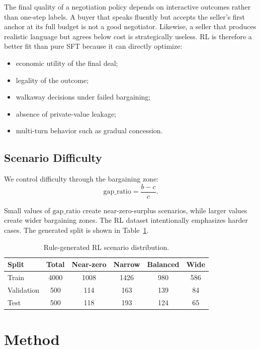 \documentclass[11pt]{article}
\begin{document}
The final quality of a negotiation policy depends on interactive outcomes rather than one-step labels. A buyer that speaks fluently but accepts the seller's first anchor at its full budget is not a good negotiator. Likewise, a seller that produces realistic language but agrees below cost is strategically useless. RL is therefore a better fit than pure SFT because it can directly optimize:
\begin{itemize}
    \item economic utility of the final deal;
    \item legality of the outcome;
    \item walkaway decisions under failed bargaining;
    \item absence of private-value leakage;
    \item multi-turn behavior such as gradual concession.
\end{itemize}

\subsection{Scenario Difficulty}

We control difficulty through the bargaining zone:
\begin{equation}
    \text{gap\_ratio} = \frac{b-c}{c}.
\end{equation}

Small values of $\text{gap\_ratio}$ create near-zero-surplus scenarios, while larger values create wider bargaining zones. The RL dataset intentionally emphasizes harder cases. The generated split is shown in Table~\ref{tab:data-distribution}.

\begin{table}[H]
\centering
\caption{Rule-generated RL scenario distribution.}
\label{tab:data-distribution}
\begin{tabular}{lccccc}
\toprule
Split & Total & Near-zero & Narrow & Balanced & Wide \\
\midrule
Train & 4000 & 1008 & 1426 & 980 & 586 \\
Validation & 500 & 114 & 163 & 139 & 84 \\
Test & 500 & 118 & 193 & 124 & 65 \\
\bottomrule
\end{tabular}
\end{table}

\section{Method}
\end{document}
